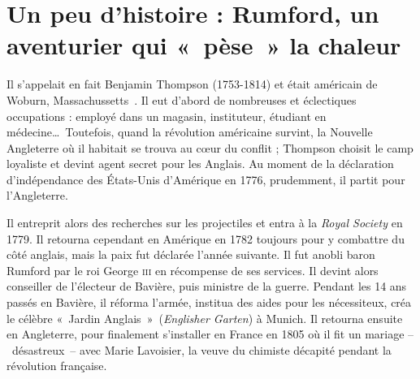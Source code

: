 \atstartofhistorysection
\section[Un peu d’histoire : l’aventurier Rumford]{Un peu d’histoire :\onlyamphibook{\\} Rumford, un aventurier qui «~pèse~» la chaleur}
\label{ch_histoire_rumford_depondt}


	Il s'appelait en fait Benjamin Thompson (1753-1814) et était américain de Woburn, Massachussetts~\cite{millar1996}. Il eut d'abord de nombreuses et éclectiques occupations : employé dans un magasin, instituteur, étudiant en médecine…\ Toutefois, quand la révolution américaine survint, la Nouvelle Angleterre où il habitait se trouva au cœur du conflit ; Thompson choisit le camp loyaliste et devint agent secret pour les Anglais. Au moment de la déclaration d'indépendance des États-Unis d'Amérique en 1776, prudemment, il partit pour l'Angleterre.

	Il entreprit alors des recherches sur les projectiles et entra à la \textit{Royal Society} en 1779. Il retourna cependant en Amérique en 1782 toujours pour y combattre du côté anglais, mais la paix fut déclarée l'année suivante. Il fut anobli baron Rumford par le roi George \textsc{iii} en récompense de ses services. Il devint alors conseiller de l'électeur de Bavière, puis ministre de la guerre. Pendant les 14 ans passés en Bavière, il réforma l'armée, institua des aides pour les nécessiteux, créa le célèbre «~Jardin Anglais~»\ (\textit{Englisher Garten}) à Munich. Il retourna ensuite en Angleterre, pour finalement s'installer en France en 1805 où il fit un mariage --\ désastreux\ -- avec Marie Lavoisier, la veuve du chimiste décapité pendant la révolution française.
	
